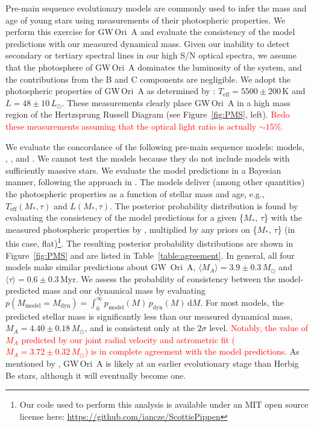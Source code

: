 \documentclass[twocolumn]{aastex61}
\newcommand{\todo}[1]{ \textcolor{red}{#1}}
\newcommand{\gw}{GW\,Ori}
\begin{document}




Pre-main sequence evolutionary models are commonly used to infer the mass and age of young stars using measurements of their photospheric properties. We perform this exercise for \gw~A and evaluate the consistency of the model predictions with our measured dynamical mass. Given our inability to detect secondary or tertiary spectral lines in our high S/N optical spectra, we assume that the photosphere of \gw~A dominates the luminosity of the system, and the contributions from the B and C components are negligible. We adopt the photospheric properties of \gw~A as determined by \citet{fang14}: $T_\mathrm{eff} = 5500 \pm 200\,\mathrm{K}$ and $L = 48 \pm 10\,L_\odot$. These measurements clearly place \gw~A in a high mass region of the Hertzsprung Russell Diagram (see Figure~\ref{fig:PMS}, left). \todo{Redo these measurements assuming that the optical light ratio is actually $\sim 15\%$.}

We evaluate the concordance of the following pre-main sequence models: \citet{choi16} models, \citet{dotter08}, \citet{tognelli11}, and \citet{siess00}. We cannot test the \citet{baraffe15} models because they do not include models with sufficiently massive stars. We evaluate the model predictions in a Bayesian manner, following the approach in \citet{jorgensen05,rosenfeld12b,czekala15a}. The models deliver (among other quantities) the photospheric properties as a function of stellar mass and age,
e.g., $T_\mathrm{eff}(M_\ast, \tau)$ and $L(M_\ast, \tau)$.
The posterior probability distribution is found by evaluating the consistency of the model predictions for a given \{$M_\ast$, $\tau$\} with the measured photospheric properties by \citet{fang14}, multiplied by any priors on  \{$M_\ast$, $\tau$\} (in this case, flat)\footnote{Our code used to perform this analysis is available under an MIT open source license here: \url{https://github.com/iancze/ScottiePippen}}.
The resulting posterior probability distributions are shown in Figure~\ref{fig:PMS} and are listed in Table~\ref{table:agreement}. In general, all four models make similar predictions about GW~Ori~A, $\langle M_A \rangle = 3.9 \pm 0.3\,M_\odot$ and $\langle \tau \rangle = 0.6 \pm 0.3\,$Myr. We assess the probability of consistency between the model-predicted mass and our dynamical mass by evaluating $p(M_\mathrm{model} = M_\mathrm{dyn}) = \int_0^\infty p_\mathrm{model}(M) \, p_\mathrm{dyn}(M) \, \mathrm{d}M$. For most models, the predicted stellar mass is significantly less than our measured dynamical mass, $M_A = 4.40 \pm 0.18\,M_\odot$, and is consistent only at the $2\sigma$ level. \todo{Notably, the value of $M_A$ predicted by our joint radial velocity and astrometric fit ($M_A = 3.72 \pm 0.32\,M_\odot$) is in complete agreement with the model predictions.} As mentioned by \citet{fang14}, \gw~A is likely at an earlier evolutionary stage than Herbig Be stars, although it will eventually become one.
\end{document}
